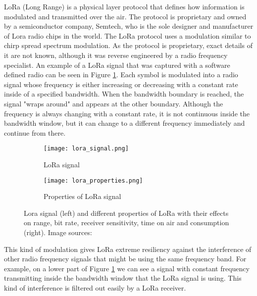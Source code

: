 LoRa (Long Range) is a physical layer protocol that defines how information is modulated and transmitted over the air\cite{lora_article}\cite{lora_nbiot}.
The protocol is proprietary and owned by a semiconductor company, Semtech, who is the sole designer and manufacturer of Lora radio chips in the world.
The LoRa protocol uses a modulation similar to chirp spread spectrum modulation\cite{lora_article}.
As the protocol is proprietary, exact details of it are not known, although it was reverse engineered by a radio frequency specialist\cite{lora_github}.
An example of a LoRa signal that was captured with a software defined radio can be seen in Figure \ref{lora1}.
Each symbol is modulated into a radio signal whose frequency is either increasing or decreasing with a constant rate inside of a specified bandwidth.
When the bandwidth boundary is reached, the signal "wraps around" and appears at the other boundary.
Although the frequency is always changing with a constant rate, it is not continuous inside the bandwidth window, but it can change to a different frequency immediately and continue from there.

\begin{figure}[ht]
    \begin{subfigure}{0.3\textwidth}
        \centering
        \texttt{[image: lora\_signal.png]} 
        \caption{ LoRa signal}
        \label{lora1}
    \end{subfigure}
    \hspace{0.5cm}%
    \begin{subfigure}{0.7\textwidth}
        \texttt{[image: lora\_properties.png]}
        \caption{ Properties of LoRa signal}
        \label{lora2}
    \end{subfigure}
\caption[Properties of Lora signal.] {Lora signal (left) and different properties of LoRa with their effects on range, bit rate, receiver sensitivity, time on air and consumption (right). Image sources:\cite{lora_github}\cite{lora_philly}}
    \label{lora}
\end{figure}

This kind of modulation gives LoRa extreme resiliency against the interference of other radio frequency signals that might be using the same frequency band\cite{lora_article}\cite{lora_philly}.
For example, on a lower part of Figure \ref{lora1} we can see a signal with constant frequency transmitting inside the bandwidth window that the LoRa signal is using.
This kind of interference is filtered out easily by a LoRa receiver.

